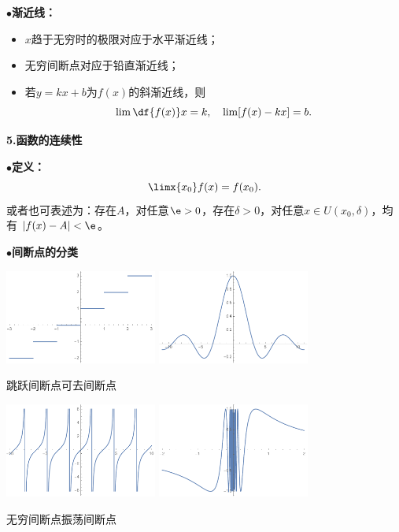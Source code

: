 $\bullet${\bf 渐近线：}
\begin{itemize}
  \setlength{\itemindent}{1cm}
  \item $x$趋于无穷时的极限对应于水平渐近线；
  \item 无穷间断点对应于铅直渐近线；
  \item 若$y=kx+b$为$f(x)$的斜渐近线，则
  $$\lim\df{f(x)}x=k,\quad \lim[f(x)-kx]=b.$$
\end{itemize}

{\bf 5.函数的连续性}

$\bullet${\bf 定义：}
$$\limx{x_0}f(x)=f(x_0).$$
或者也可表述为：存在$A$，对任意$\e>0$，存在$\delta>0$，对任意$x\in U(x_0,\delta)$，均有
$|f(x)-A|<\e$。

$\bullet${\bf 间断点的分类}

\begin{center}
	\includegraphics[width=5cm]{./images/ch3/roundx.pdf}\quad
	\includegraphics[width=5cm]{./images/ch3/sinxox.pdf}
	
	跳跃间断点\hspace{4cm}可去间断点
	
	\includegraphics[width=5cm]{./images/ch3/tanx.pdf}\quad
	\includegraphics[width=5cm]{./images/ch3/sin1ox.pdf}
	
	无穷间断点\hspace{4cm}振荡间断点
\end{center}

